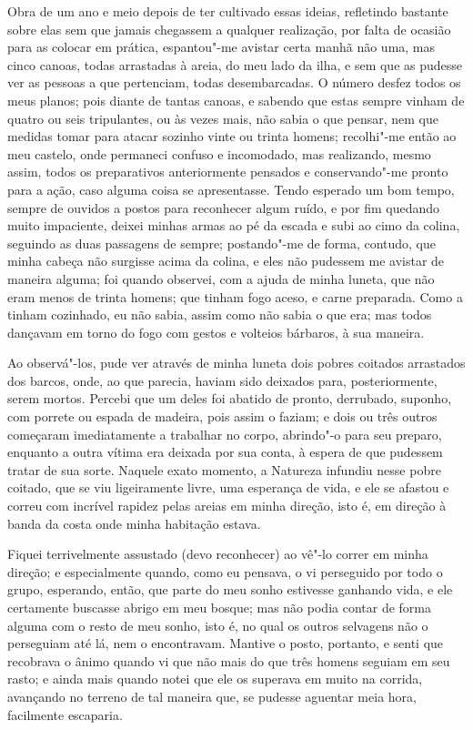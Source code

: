 Obra de um ano e meio depois de ter cultivado essas ideias, refletindo
bastante sobre elas sem que jamais chegassem a qualquer realização, por
falta de ocasião para as colocar em prática, espantou"-me avistar certa
manhã não uma, mas cinco canoas, todas arrastadas à areia, do meu lado
da ilha, e sem que as pudesse ver as pessoas a que pertenciam, todas
desembarcadas. O número desfez todos os meus planos; pois diante de
tantas canoas, e sabendo que estas sempre vinham de quatro ou seis
tripulantes, ou às vezes mais, não sabia o que pensar, nem que medidas
tomar para atacar sozinho vinte ou trinta homens; recolhi"-me então ao
meu castelo, onde permaneci confuso e incomodado, mas realizando, mesmo
assim, todos os preparativos anteriormente pensados e conservando"-me
pronto para a ação, caso alguma coisa se apresentasse. Tendo esperado um
bom tempo, sempre de ouvidos a postos para reconhecer algum ruído, e por
fim quedando muito impaciente, deixei minhas armas ao pé da escada e
subi ao cimo da colina, seguindo as duas passagens de sempre;
postando"-me de forma, contudo, que minha cabeça não surgisse acima da
colina, e eles não pudessem me avistar de maneira alguma; foi quando
observei, com a ajuda de minha luneta, que não eram menos de trinta
homens; que tinham fogo aceso, e carne preparada. Como a tinham
cozinhado, eu não sabia, assim como não sabia o que era; mas todos
dançavam em torno do fogo com gestos e volteios bárbaros, à sua maneira.

Ao observá"-los, pude ver através de minha luneta dois pobres coitados
arrastados dos barcos, onde, ao que parecia, haviam sido deixados para,
posteriormente, serem mortos. Percebi que um deles foi abatido de
pronto, derrubado, suponho, com porrete ou espada de madeira, pois assim
o faziam; e dois ou três outros começaram imediatamente a trabalhar no
corpo, abrindo"-o para seu preparo, enquanto a outra vítima era deixada
por sua conta, à espera de que pudessem tratar de sua sorte. Naquele
exato momento, a Natureza infundiu nesse pobre coitado, que se viu
ligeiramente livre, uma esperança de vida, e ele se afastou e correu com
incrível rapidez pelas areias em minha direção, isto é, em direção à
banda da costa onde minha habitação estava.

Fiquei terrivelmente assustado (devo reconhecer) ao vê"-lo correr em
minha direção; e especialmente quando, como eu pensava, o vi perseguido
por todo o grupo, esperando, então, que parte do meu sonho estivesse
ganhando vida, e ele certamente buscasse abrigo em meu bosque; mas não
podia contar de forma alguma com o resto de meu sonho, isto é, no qual
os outros selvagens não o perseguiam até lá, nem o encontravam. Mantive
o posto, portanto, e senti que recobrava o ânimo quando vi que não mais
do que três homens seguiam em seu rasto; e ainda mais quando notei que
ele os superava em muito na corrida, avançando no terreno de tal maneira
que, se pudesse aguentar meia hora, facilmente escaparia.

